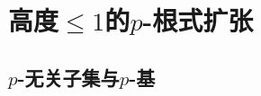 \chapter{高度\texorpdfstring{$\leq 1$}{<=1}的\texorpdfstring{$p$}{p}-根式扩张}

\section{\texorpdfstring{$p$}{p}-无关子集与\texorpdfstring{$p$}{p}-基}
